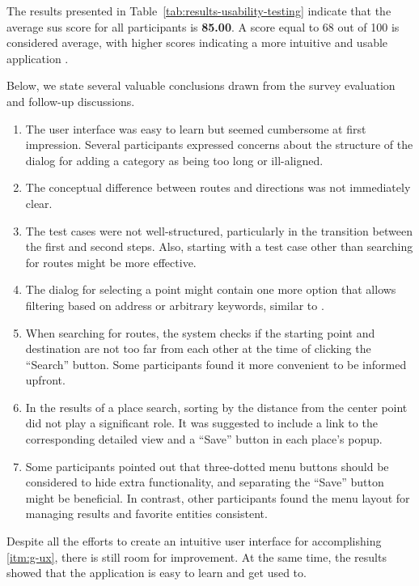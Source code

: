 The results presented in Table~\ref{tab:results-usability-testing} indicate that the average \acs{sus} score for all participants is \textbf{85.00}. A score equal to 68 out of 100 is considered average, with higher scores indicating a more intuitive and usable application \cite{sauro11}.

Below, we state several valuable conclusions drawn from the survey evaluation and follow-up discussions.

\begin{enumerate}
\item The user interface was easy to learn but seemed cumbersome at first impression. Several participants expressed concerns about the structure of the dialog for adding a category as being too long or ill-aligned.
\item The conceptual difference between routes and directions was not immediately clear.
\item The test cases were not well-structured, particularly in the transition between the first and second steps. Also, starting with a test case other than searching for routes might be more effective.
\item The dialog for selecting a point might contain one more option that allows filtering based on address or arbitrary keywords, similar to \emph{}.
\item When searching for routes, the system checks if the starting point and destination are not too far from each other at the time of clicking the ``Search'' button. Some participants found it more convenient to be informed upfront.
\item In the results of a place search, sorting by the distance from the center point did not play a significant role. It was suggested to include a link to the corresponding detailed view and a ``Save'' button in each place's popup.
\item Some participants pointed out that three-dotted menu buttons should be considered to hide extra functionality, and separating the ``Save'' button might be beneficial. In contrast, other participants found the menu layout for managing results and favorite entities consistent.
\end{enumerate}

Despite all the efforts to create an intuitive user interface for accomplishing \ref{itm:g-ux}, there is still room for improvement. At the same time, the results showed that the application is easy to learn and get used to.
